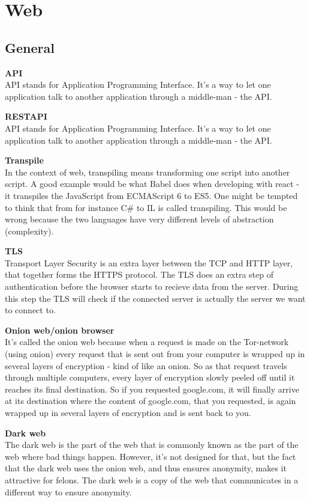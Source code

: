\section{Web}

\subsection{General}
\textbf{API} \\
API stands for Application Programming Interface. It's a way to let one application talk to another application through a middle-man - the API. 

\textbf{RESTAPI} \\
API stands for Application Programming Interface. It's a way to let one application talk to another application through a middle-man - the API. 

\textbf{Transpile} \\
In the context of web, transpiling means transforming one script into another script. A good example would be what Babel does when developing with react - it transpiles the JavaScript from ECMAScript 6 to ES5. One might be tempted to think that from for instance C\# to IL is called transpiling. This would be wrong because the two languages have very different levels of abstraction (complexity). 

\textbf{TLS} \\ 
Transport Layer Security is an extra layer between the TCP and HTTP layer, that together forms the HTTPS protocol. The TLS does an extra step of authentication before the browser starts to recieve data from the server. During this step the TLS will check if the connected server is actually the server we want to connect to. \cite{web:ssl}


\textbf{Onion web/onion browser} \\
It's called the onion web because when a request is made on the Tor-network (using onion) every request that is sent out from your computer is wrapped up in several layers of encryption - kind of like an onion. So as that request travels through multiple computers, every layer of encryption slowly peeled off until it reaches its final destination. So if you requested google.com, it will finally arrive at its destination where the content of google.com, that you requested, is again wrapped up in several layers of encryption and is sent back to you. 

\textbf{Dark web} \\
The dark web is the part of the web that is commonly known as the part of the web where bad things happen. However, it's not designed for that, but the fact that the dark web uses the onion web, and thus ensures anonymity, makes it attractive for felons. The dark web is a copy of the web that communicates in a different way to ensure anonymity. \cite{web:darkWeb}


